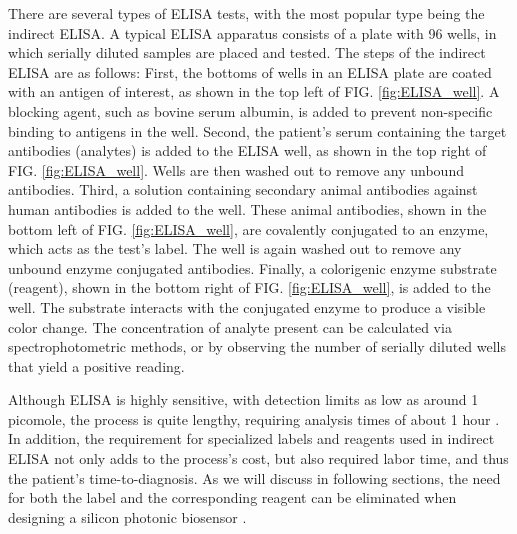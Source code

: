 \documentclass[aps,prl,twocolumn, superscriptaddress,nobalancelastpage]{revtex4}
\begin{document}
There are several types of ELISA tests, with the most popular type being the indirect ELISA. A typical ELISA apparatus consists of a plate with 96 wells, in which serially diluted samples are placed and tested. The steps of the indirect ELISA are as follows: First, the bottoms of wells in an ELISA plate are coated with an antigen of interest, as shown in the top left of FIG. \ref{fig:ELISA_well}. A blocking agent, such as bovine serum albumin, is added to prevent non-specific binding to antigens in the well. Second, the patient's serum containing the target antibodies (analytes) is added to the ELISA well, as shown in the top right of FIG. \ref{fig:ELISA_well}. Wells are then washed out to remove any unbound antibodies. Third, a solution containing secondary animal antibodies against human antibodies is added to the well. These animal antibodies, shown in the bottom left of FIG. \ref{fig:ELISA_well}, are covalently conjugated to an enzyme, which acts as the test's label. The well is again washed out to remove any unbound enzyme conjugated antibodies. Finally, a colorigenic enzyme substrate (reagent), shown in the bottom right of FIG. \ref{fig:ELISA_well}, is added to the well. The substrate interacts with the conjugated enzyme to produce a visible color change. The concentration of analyte present can be calculated via spectrophotometric methods, or by observing the number of serially diluted wells that yield a positive reading.

Although ELISA is highly sensitive, with detection limits as low as around 1 picomole, the process is quite lengthy, requiring analysis times of about 1 hour \cite{mechbiosensors}. In addition, the requirement for specialized labels and reagents used in indirect ELISA not only adds to the process's cost, but also required labor time, and thus the patient's time-to-diagnosis. As we will discuss in following sections, the need for both the label and the corresponding reagent can be eliminated when designing a silicon photonic biosensor \cite{labelfree}.

\pagebreak
\end{document}
